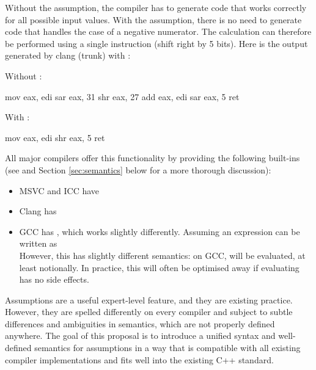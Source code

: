 Without the assumption, the compiler has to generate code that works correctly for all possible input values. With the assumption, there is no need to generate code that handles the case of a negative numerator. The calculation can therefore be performed using a single instruction (shift right by 5 bits). Here is the output generated by clang (trunk) with :

\begin{multicols}{2}
Without :

\begin{codeblock}
  mov eax, edi
  sar eax, 31
  shr eax, 27
  add eax, edi
  sar eax, 5
  ret
\end{codeblock}

\columnbreak

With :

\begin{codeblock}
  mov eax, edi
  shr eax, 5
  ret
\end{codeblock}

\end{multicols}

All major compilers offer this functionality by providing the following built-ins (see \cite{N4425} and Section \ref{sec:semantics} below for a more thorough discussion):
\begin{itemize}
\item MSVC and ICC have 
\item Clang has 
\item GCC has , which works slightly differently. Assuming an expression can be written as  \\ 
However, this has slightly different semantics: on GCC,  will be evaluated, at least notionally. In practice, this will often be optimised away if evaluating  has no side effects. 
\end{itemize}

Assumptions are a useful expert-level feature, and they are existing practice. However, they are spelled differently on every compiler and subject to subtle differences and ambiguities in semantics, which are not properly defined anywhere. The goal of this proposal is to introduce a unified syntax and well-defined semantics for assumptions in a way that is compatible with all existing compiler implementations and fits well into the existing C++ standard.

